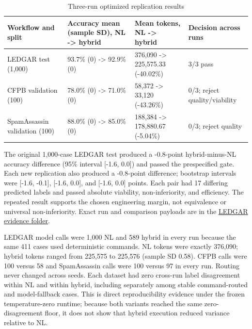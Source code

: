 \documentclass[9pt,a4paper,twocolumn]{article}
\makeatletter
\renewcommand\section{\@startsection{section}{1}{0pt}{0.7ex}{0.25ex}{\color{headingblue}\normalfont\large}}
\makeatother
\begin{document}
\section{Results}
\begin{table}[t]
\centering
\small
\caption{Three-run optimized replication results}
\begin{tabularx}{\textwidth}{@{}XXXX@{}}
\toprule
Workflow and split & Accuracy mean (sample SD), NL -> hybrid & Mean tokens, NL -> hybrid & Decision across runs \\
\midrule
LEDGAR test (1,000) & 93.7\% (0) -> 92.9\% (0) & 376,090 -> 225,575.33 (-40.02\%) & 3/3 pass \\
CFPB validation (100) & 78.0\% (0) -> 71.0\% (0) & 58,372 -> 33,120 (-43.26\%) & 0/3; reject quality/viability \\
SpamAssassin validation (100) & 88.0\% (0) -> 85.0\% (0) & 188,384 -> 178,880.67 (-5.04\%) & 0/3; reject quality \\
\bottomrule
\end{tabularx}
\end{table}

The original 1,000-case LEDGAR test produced a -0.8-point hybrid-minus-NL accuracy difference (95\% interval [-1.6, 0.0]) and passed the prespecified gate. Each new replication also produced a -0.8-point difference; bootstrap intervals were [-1.6, -0.1], [-1.6, 0.0], and [-1.6, 0.0] points. Each pair had 17 differing predicted labels and passed absolute viability, non-inferiority, and efficiency. The repeated result supports the chosen engineering margin, not equivalence or universal non-inferiority. Exact run and comparison payloads are in the \href{https://github.com/mnvsk97/PLaND/tree/codex/pland-variance-study/experiments/ledgar-text-classification/results/variance-study-20260903}{LEDGAR evidence folder}.

LEDGAR model calls were 1,000 NL and 589 hybrid in every run because the same 411 cases used deterministic commands. NL tokens were exactly 376,090; hybrid tokens ranged from 225,575 to 225,576 (sample SD 0.58). CFPB calls were 100 versus 58 and SpamAssassin calls were 100 versus 97 in every run. Routing never changed across seeds. Each dataset had zero cross-run label disagreement within NL and within hybrid, including separately among stable command-routed and model-fallback cases. This is direct reproducibility evidence under the frozen temperature-zero runtime; because both variants reached the same zero-disagreement floor, it does not show that hybrid execution reduced variance relative to NL.
\end{document}
